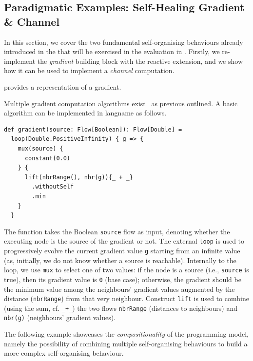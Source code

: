 \subsection{Paradigmatic Examples: Self-Healing Gradient \& Channel}
\label{acsos2023-frp:paradigmatic-examples}

In this section, we cover the two fundamental self-organising behaviours already introduced in the 
that will be exercised in the evaluation in .
%
Firstly, we re-implement the \emph{gradient} building block with the reactive extension, and we show how it can be used to implement a \emph{channel} computation.
%

\begin{example}\label{acsos2023-frp:ex:g}
%
 provides a representation of a gradient.
 
Multiple gradient computation algorithms exist~\cite{audrito2017ULT} as previous outlined. 
A basic algorithm can be implemented in \ac{langname} as follows.

\begin{lstlisting}[caption=Gradient implemented with FRASP, label=acsos2023-frp:lst:gradients]
def gradient(source: Flow[Boolean]): Flow[Double] =
  loop(Double.PositiveInfinity) { g => {
    mux(source) {
      constant(0.0)
    } {
      lift(nbrRange(), nbr(g)){_ + _}
        .withoutSelf
        .min
    }
  }
\end{lstlisting}
%
The function takes the Boolean \lstinline|source| flow as input, denoting whether the executing node is the source of the gradient or not.
%
The external \lstinline|loop| is used to progressively evolve the current gradient value \lstinline|g|
starting from an infinite value
(as, initially, we do not know whether a source is reachable).
%
Internally to the loop,
  we use \lstinline|mux| to select one of two values:
  if the node is a source (i.e., \lstinline|source| is true), then its gradient value is \lstinline|0| (base case);
  otherwise, the gradient should be the minimum value among the neighbours' gradient values augmented by the distance (\lstinline|nbrRange|) from that very neighbour.
%
Construct \lstinline|lift| is used to combine (using the sum, cf. \lstinline|_+_|) the two flows \lstinline|nbrRange| (distances to neighbours) and \lstinline|nbr(g)| (neighbours' gradient values).

\end{example}

The following example showcases the \emph{compositionality} of the programming model,
 namely the possibility
 of combining multiple self-organising behaviours
 to build a more complex self-organising behaviour.

